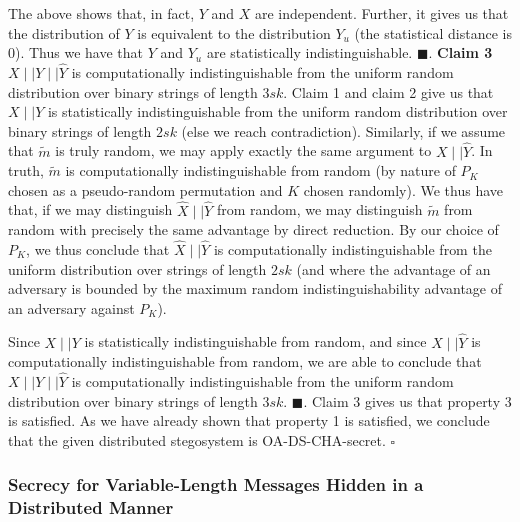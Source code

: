 \documentclass{article}
\begin{document}
\noindent The above shows that, in fact, $Y$ and $X$ are independent.  Further, it gives us that the distribution of $Y$ is 
equivalent to the distribution $Y_u$ (the statistical distance is 0).  Thus we have that $Y$ and $Y_u$ are statistically indistinguishable. $\blacksquare$.
\newline\newline
\noindent \textbf{Claim 3} $X \mid \mid Y \mid \mid \hat{Y}$ is computationally indistinguishable from the uniform random distribution over binary strings of length $3sk$.
\newline\newline
Claim 1 and claim 2 give us that $X\mid\mid Y$ is statistically indistinguishable from the uniform random distribution over binary 
strings of length $2sk$ (else we reach contradiction).  Similarly, if we assume that $\tilde{m}$ is truly random, we may apply exactly the same 
argument to $X \mid \mid \hat{Y}$.  In truth, $\tilde{m}$ is computationally indistinguishable from 
random (by nature of $P_K$ chosen as a pseudo-random permutation and $K$ chosen randomly).  We thus have that, if we may distinguish 
$\hat{X} \mid \mid \hat{Y}$ from random, we may distinguish $\tilde{m}$ from random with precisely the same advantage by direct reduction.  
By our choice of $P_K$, we thus conclude that $\hat{X} \mid \mid \hat{Y}$ is computationally indistinguishable from the uniform distribution over strings of length $2sk$ (and where the advantage of an adversary is bounded by the maximum random indistinguishability advantage of an adversary against $P_K$).

Since $X\mid\mid Y$ is statistically indistinguishable from random, and since $X \mid \mid \hat{Y}$ is computationally indistinguishable from 
random, we are able to conclude that $X \mid \mid Y \mid \mid \hat{Y}$ is computationally indistinguishable from the uniform random distribution over binary strings of length $3sk$. $\blacksquare$.
\newline\newline
\noindent Claim 3 gives us that property 3 is satisfied.  As we have already shown that property 1 is satisfied, we conclude that the given 
distributed stegosystem is OA-DS-CHA-secret. $\square$

\subsubsection{Secrecy for Variable-Length Messages Hidden in a Distributed Manner}
\end{document}
